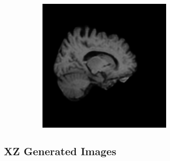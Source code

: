 \documentclass[12pt, fleqn, titlepage]{article}
\newcommand\skipperer{0.45pt}
\begin{document}
\begin{figure}[H]
\begin{subfigure}[b]{0.7\textwidth}
		\hskip\skipperer
		\includegraphics[width=0.15\linewidth]{imgs/3T_no_noise}
	\end{subfigure}
\end{figure}

\subsection{XZ Generated Images}\label{xz_generated}
\end{document}
